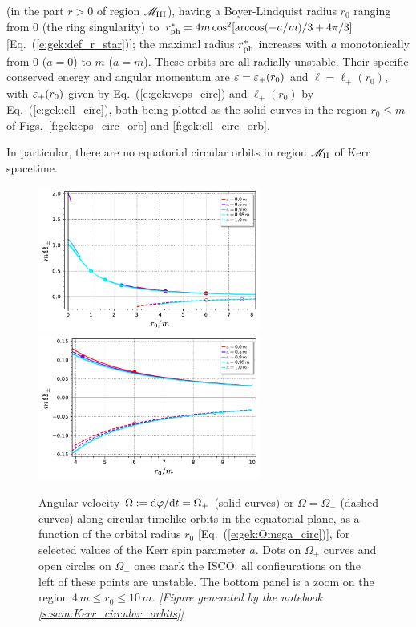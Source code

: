 \begin{prop}
\begin{enumerate}
(in the part $r>0$ of region $\mathscr{M}_{\rm III}$),
having a Boyer-Lindquist radius $r_0$ ranging
from $0$ (the ring singularity) to
$r_{\rm ph}^* = 4 m \cos^2[\arccos(-a/m)/3 + 4\pi/3]$
[Eq.~(\ref{e:gek:def_r_star})];
the maximal radius $r_{\rm ph}^*$ increases with $a$ monotonically from $0$ ($a=0$) to $m$ ($a=m$).
These orbits are all radially unstable. Their specific conserved energy and angular momentum
are $\varepsilon = \varepsilon_+(r_0)$ and $\ell = \ell_+(r_0)$, with
$\varepsilon_+(r_0)$ given by Eq.~(\ref{e:gek:veps_circ}) and $\ell_+(r_0)$ by
Eq.~(\ref{e:gek:ell_circ}), both being plotted as the solid
curves in the region $r_0 \leq m$ of Figs.~\ref{f:gek:eps_circ_orb} and \ref{f:gek:ell_circ_orb}.
\end{enumerate}
In particular, there are no equatorial circular orbits in region $\mathscr{M}_{\rm II}$ of Kerr spacetime.
\end{prop}


\begin{figure}
\begin{center}
\includegraphics[width=0.65\textwidth]{gek_omega_circ_orb.pdf}\\
\includegraphics[width=0.65\textwidth]{gek_omega_circ_orb_zoom.pdf}
\end{center}
\caption[]{\label{f:gek:omega_circ_orb} \footnotesize
Angular velocity $\Omega:=\mathrm{d}\varphi/\mathrm{d} t=\Omega_+$ (solid curves) or $\Omega=\Omega_-$
(dashed curves) along circular timelike
orbits in the equatorial plane, as a function of the orbital radius $r_0$
[Eq.~(\ref{e:gek:Omega_circ})], for selected values of the Kerr spin parameter $a$.
Dots on $\Omega_+$ curves and open circles on $\Omega_-$ ones mark the ISCO: all
configurations on the left of these points are unstable.
The bottom panel is a zoom on the region $4\,m \leq r_0 \leq 10\,m$.
\textsl{[Figure generated by the notebook \ref{s:sam:Kerr_circular_orbits}]}
}
\end{figure}


